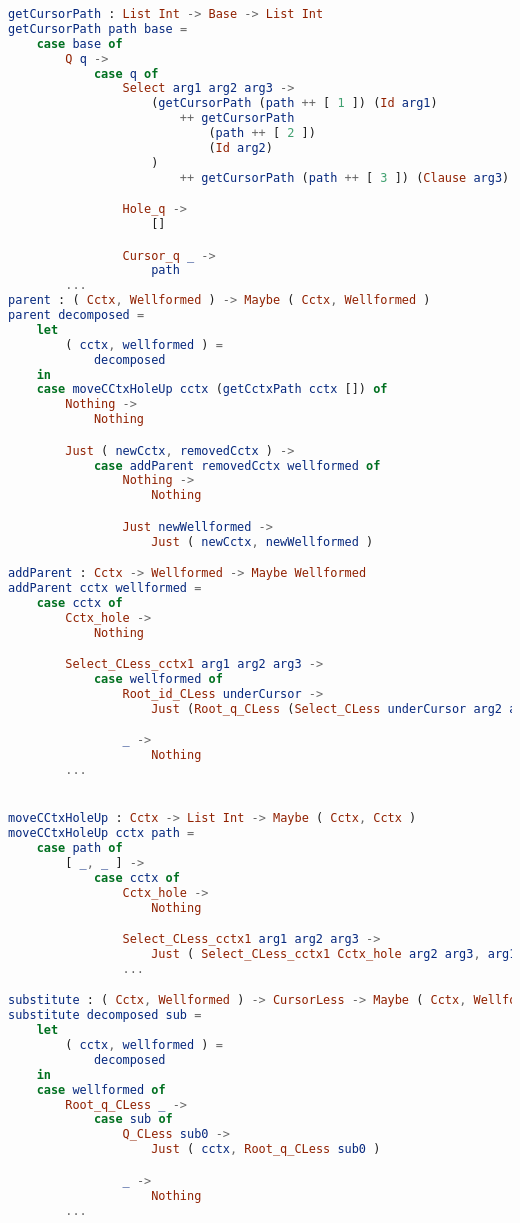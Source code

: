 \newpage

\begin{lstlisting}[style=inline, language=elm, caption={Generated functions for cursor movement for the SLQ language}, label={lst:SQL-movement}]
getCursorPath : List Int -> Base -> List Int
getCursorPath path base =
    case base of
        Q q ->
            case q of
                Select arg1 arg2 arg3 ->
                    (getCursorPath (path ++ [ 1 ]) (Id arg1)
                        ++ getCursorPath
                            (path ++ [ 2 ])
                            (Id arg2)
                    )
                        ++ getCursorPath (path ++ [ 3 ]) (Clause arg3)

                Hole_q ->
                    []

                Cursor_q _ ->
                    path
        ...
parent : ( Cctx, Wellformed ) -> Maybe ( Cctx, Wellformed )
parent decomposed =
    let
        ( cctx, wellformed ) =
            decomposed
    in
    case moveCCtxHoleUp cctx (getCctxPath cctx []) of
        Nothing ->
            Nothing

        Just ( newCctx, removedCctx ) ->
            case addParent removedCctx wellformed of
                Nothing ->
                    Nothing

                Just newWellformed ->
                    Just ( newCctx, newWellformed )

addParent : Cctx -> Wellformed -> Maybe Wellformed
addParent cctx wellformed =
    case cctx of
        Cctx_hole ->
            Nothing

        Select_CLess_cctx1 arg1 arg2 arg3 ->
            case wellformed of
                Root_id_CLess underCursor ->
                    Just (Root_q_CLess (Select_CLess underCursor arg2 arg3))

                _ ->
                    Nothing
        ...


moveCCtxHoleUp : Cctx -> List Int -> Maybe ( Cctx, Cctx )
moveCCtxHoleUp cctx path =
    case path of
        [ _, _ ] ->
            case cctx of
                Cctx_hole ->
                    Nothing

                Select_CLess_cctx1 arg1 arg2 arg3 ->
                    Just ( Select_CLess_cctx1 Cctx_hole arg2 arg3, arg1 )
                ...

substitute : ( Cctx, Wellformed ) -> CursorLess -> Maybe ( Cctx, Wellformed )
substitute decomposed sub =
    let
        ( cctx, wellformed ) =
            decomposed
    in
    case wellformed of
        Root_q_CLess _ ->
            case sub of
                Q_CLess sub0 ->
                    Just ( cctx, Root_q_CLess sub0 )

                _ ->
                    Nothing
        ...
\end{lstlisting}

